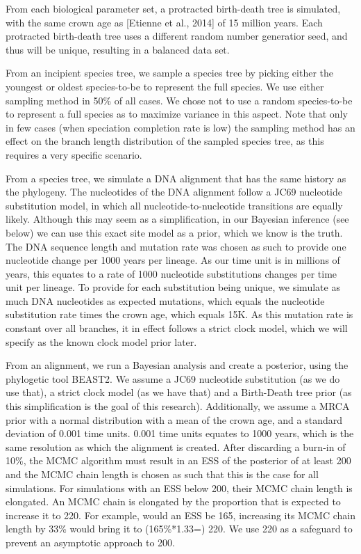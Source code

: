 \documentclass{article}
\begin{document}
From each biological parameter set, a protracted birth-death tree is simulated,
with the same crown age as [Etienne et al., 2014] of 15 million years. 
Each protracted birth-death tree uses a different random number
generatior seed, and thus will be unique, resulting in a balanced 
data set. 

From an incipient species tree, we sample a species tree
by picking either the youngest or oldest
species-to-be to represent the full species.
We use either sampling method in 50\% of all cases. We chose not to use
a random species-to-be to represent a full species as to maximize variance
in this aspect. Note that only in few cases (when speciation completion rate
is low) the sampling method has an effect on the branch length distribution
of the sampled species tree, as this requires a very specific scenario.

From a species tree, we simulate a DNA alignment that has the same history
as the phylogeny. The nucleotides of the DNA alignment follow a JC69
nucleotide substitution model, in which all nucleotide-to-nucleotide transitions
are equally likely. Although this may seem as a simplification, in our Bayesian
inference (see below) we can use this exact site model as a prior, which we 
know is the truth.
The DNA sequence length and mutation rate was chosen as such to provide one
nucleotide change per 1000 years per lineage. As our time unit is in 
millions of years, this equates to a rate of 1000 nucleotide substitutions 
changes per time unit per lineage. To provide for each substitution being unique,
we simulate as much DNA nucleotides as expected mutations, which equals the
nucleotide substitution rate times the crown age, which equals 15K. As this
mutation rate is constant over all branches, it in effect follows a strict 
clock model, which we will specify as the known clock model prior later.

From an alignment, we run a Bayesian analysis and create a posterior, 
using the phylogetic tool BEAST2. We assume a
JC69 nucleotide substitution (as we do use that), a strict clock model (as
we have that) and a Birth-Death tree prior (as this simplification is the goal
of this research). Additionally, we assume a MRCA prior with a normal distribution
with a mean of the crown age, and a standard deviation of 0.001 time units. 0.001
time units equates to 1000 years, which is the same resolution as which the
alignment is created. After discarding a burn-in of 10\%, the MCMC algorithm must 
result in an ESS of the posterior of at least 200 and the MCMC chain length is 
chosen as such that this is the case for all simulations. For simulations
with an ESS below 200, their MCMC chain length is elongated. An
MCMC chain is elongated by the proportion that is expected to increase it to 220. 
For example, would an ESS be 165, increasing its MCMC chain length by 33\% 
would bring it to (165\%*1.33=) 220. We use 220 as a safeguard to prevent 
an asymptotic approach to 200. 
\end{document}
